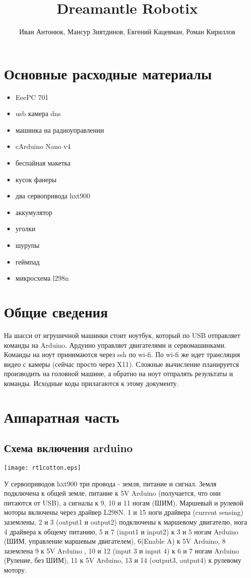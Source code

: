 \documentclass[a4paper]{article}
\begin{document}
\author{Иван Антонюк, Мансур Зиятдинов, Евгений Кацевман, Роман Кириллов}
\title{Dreamantle Robotix}
\maketitle


\section{Основные расходные материалы}
\begin{itemize}
\item EeePC 701
\item usb камера dns
\item машинка на радиоуправлении
\item cArduino Nano v4
\item беспайная макетка
\item кусок фанеры
\item два сервопривода hxt900
\item аккумулятор
\item уголки
\item шурупы
\item геймпад
\item микросхема l298n
\end{itemize}

\section{Общие сведения}
На шасси от игрушечной машинки стоит ноутбук, который по USB отправляет команды на Arduino. Ардуино управляет двигателями и сервомашинками.
Команды на ноут принимаются через ssh по wi-fi. По wi-fi же идет трансляция видео с камеры (сейчас просто через X11). Сложные вычисление планируется производить на головной машине, а обратно на ноут отпралять результаты и команды.
Исходные коды прилагаются к этому документу.

\section{Аппаратная часть}

\subsection{Схема включения arduino}
\texttt{[image: rt1cotton.eps]}
 
У сервоприводов hxt900 три провода - земля, питание и сигнал. Земля подключена к общей земле, питание к 5V Arduino (получается, что они питаются от USB), а сигналы к 9, 10 и 11 ногам (ШИМ).
Маршевый и рулевой моторы включены через драйвер L298N. 1 и 15 ноги драйвера (current sensing) заземлены, 2 и 3 (output1 и output2) подключены к маршевому двигателю, нога 4 драйвера к общему питанию, 5 и 7 (input1 и input2) к 3 и 5 ногам Arduino (ШИМ, управление маршевым двигателем), 6(Enable A) к 5V Arduino, 8 заземлена 9 к 5V Arduino , 10 и 12 (input 3 и input 4) к 6 и 7 ногам Arduino (Руление, без ШИМ), 11 к 5V Arduino, 13 и 14 (output3, output4) к рулевому мотору.   
\end{document}
